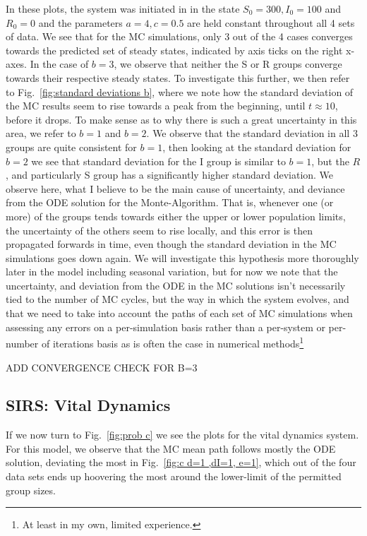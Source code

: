 \documentclass[10pt,showpacs,preprintnumbers,amsmath,amssymb,nofootinbib,aps,prl,twocolumn,groupedaddress,superscriptaddress,showkeys]{revtex4-1}
\begin{document}
    In these plots, the system was initiated in in the state $S_0 = 300, I_0=100$ and $R_0=0$ and the parameters $a=4, c=0.5$ are held constant throughout all 4 sets of data. We see that for the MC simulations, only 3 out of the 4 cases converges towards the predicted set of steady states, indicated by axis ticks on the right x-axes. In the case of $b=3$, we observe that neither the S or R groups converge towards their respective steady states. To investigate this further, we then refer to Fig.~\ref{fig:standard deviations b}, where we note how the standard deviation of the MC results seem to rise towards a peak from the beginning, until $t\approx10$, before it drops. To make sense as to why there is such a great uncertainty in this area, we refer to $b=1$ and $b=2$. We observe that the standard deviation in all 3 groups are quite consistent for $b=1$, then looking at the standard deviation for $b=2$  we see that standard deviation for the I group is similar to $b=1$, but the $R$, and particularly S group has a significantly higher standard deviation. We observe here, what I believe to be the main cause of uncertainty, and deviance from the ODE solution for the Monte-Algorithm. That is, whenever one (or more) of the groups tends towards either the upper or lower population limits, the uncertainty of the others seem to rise locally, and this error is then propagated forwards in time, even though the standard deviation in the MC simulations goes down again. We will investigate this hypothesis more thoroughly later in the model including seasonal variation, but for now we note that the uncertainty, and deviation from the ODE in the MC solutions isn't necessarily tied to the number of MC cycles, but the way in which the system evolves, and that we need to take into account the paths of each set of MC simulations when assessing any errors on a per-simulation basis rather than a per-system or per-number of iterations basis as is often the case in numerical methods\footnote{At least in my own, limited experience.}

    ADD CONVERGENCE CHECK FOR B=3


  \subsection{SIRS: Vital Dynamics}
    If we now turn to Fig.~\ref{fig:prob c} we see the plots for the vital dynamics system.
    For this model, we observe that the MC mean path follows mostly the ODE solution, deviating the most in Fig.~\ref{fig:c d=1 ,dI=1, e=1}, which out of the four data sets ends up hoovering the most around the lower-limit of the permitted group sizes.
\end{document}
